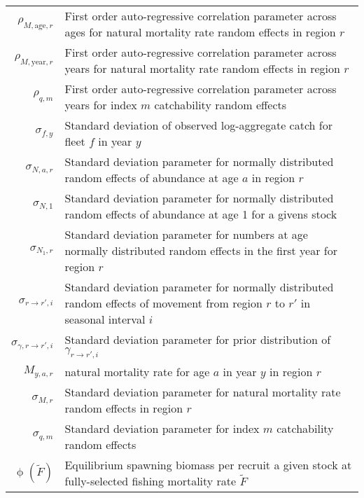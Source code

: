 \begin{longtable}[c]{r p{}}
$\rho_{M,\text{age},r}$ & First order auto-regressive correlation parameter across ages for natural mortality rate random effects in region $r$\\
$\rho_{M,\text{year},r}$ & First order auto-regressive correlation parameter across years for natural mortality rate random effects in region $r$\\
$\rho_{q,m}$ & First order auto-regressive correlation parameter across years for index $m$ catchability random effects\\
$\sigma_{f,y}$ & Standard deviation of observed log-aggregate catch for fleet $f$ in year $y$\\
$\sigma_{N,a,r}$ & Standard deviation parameter for normally distributed random effects of abundance at age $a$ in region $r$\\
$\sigma_{N,1}$ & Standard deviation parameter for normally distributed random effects of abundance at age 1 for a givens stock\\
$\sigma_{N_1,r}$ & Standard deviation parameter for numbers at age normally distributed random effects in the first year for region $r$\\
$\sigma_{r \rightarrow r',i}$ & Standard deviation parameter for normally distributed random effects of movement from region $r$ to $r'$ in seasonal interval $i$\\
$\sigma_{\gamma, r \rightarrow r',i}$ & Standard deviation parameter for prior distribution of $\gamma_{r\rightarrow r',i}$\\
$M_{y,a,r}$ & natural mortality rate for age $a$ in year $y$ in region $r$\\
$\sigma_{M,r}$ & Standard deviation parameter for natural mortality rate random effects in region $r$\\
$\sigma_{q,m}$ & Standard deviation parameter for index $m$ catchability random effects\\
$\upphi(\widetilde{F})$ & Equilibrium spawning biomass per recruit a given stock at fully-selected fishing mortality rate $\widetilde{F}$
\end{longtable}
